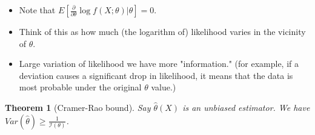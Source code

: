 \documentclass[11pt,reqno]{amsart}
\newtheorem{theorem}{Theorem}
\theoremstyle{remark}
\begin{document}
\begin{itemize}
\item Note that $E[\frac{\partial}{\partial\theta}\log f(X;\theta)|\theta]=0$.
\item Think of this as how much (the logarithm of) likelihood varies in the vicinity of $\theta$.
\item Large variation of likelihood we have more "information." (for example, if a deviation causes a significant drop in likelihood, 
it means that the data is most probable under the original $\theta$ value.)
\end{itemize}

\begin{theorem} [Cramer-Rao bound]
Say $\hat\theta(X)$ is an unbiased estimator. We have $Var(\hat\theta)\geq \frac 1{\mathcal{I}(\theta)}$.
\end{theorem}
\end{document}
